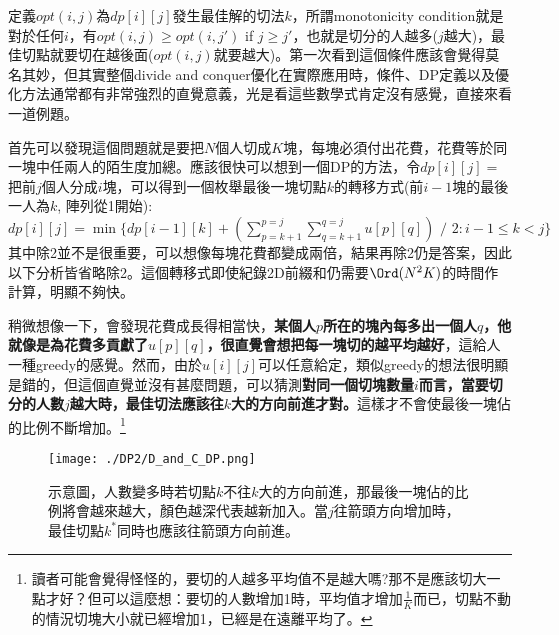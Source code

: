 定義$opt(i, j)$為$dp[i][j]$發生最佳解的切法$k$，所謂monotonicity condition就是對於任何$i$，有$opt(i, j) \geq opt(i, j')$ if $j \geq j'$，也就是切分的人越多($j$越大)，最佳切點就要切在越後面($opt(i, j)$就要越大)。第一次看到這個條件應該會覺得莫名其妙，但其實整個divide and conquer優化在實際應用時，條件、DP定義以及優化方法通常都有非常強烈的直覺意義，光是看這些數學式肯定沒有感覺，直接來看一道例題。


首先可以發現這個問題就是要把$N$個人切成$K$塊，每塊必須付出花費，花費等於同一塊中任兩人的陌生度加總。應該很快可以想到一個DP的方法，令$dp[i][j] = $把前$j$個人分成$i$塊，可以得到一個枚舉最後一塊切點$k$的轉移方式(前$i-1$塊的最後一人為$k$, 陣列從1開始): \\
\hspace*{1.5cm} $dp[i][j] = \min\{dp[i - 1][k] + (\sum_{p = k + 1}^{p = j} \sum_{q = k + 1}^{q = j} u[p][q])\mbox{ / }2 : i - 1 \leq k < j \}$ \\
其中除2並不是很重要，可以想像每塊花費都變成兩倍，結果再除2仍是答案，因此以下分析皆省略除2。這個轉移式即使紀錄2D前綴和仍需要$\Ord(N^2K)$的時間作計算，明顯不夠快。

稍微想像一下，會發現花費成長得相當快，\textbf{某個人$p$所在的塊內每多出一個人$q$，他就像是為花費多貢獻了$u[p][q]$，很直覺會想把每一塊切的越平均越好}，這給人一種greedy的感覺。然而，由於$u[i][j]$可以任意給定，類似greedy的想法很明顯是錯的，但這個直覺並沒有甚麼問題，可以猜測\textbf{對同一個切塊數量$i$而言，當要切分的人數$j$越大時，最佳切法應該往$k$大的方向前進才對。}這樣才不會使最後一塊佔的比例不斷增加。\footnote{讀者可能會覺得怪怪的，要切的人越多平均值不是越大嗎?那不是應該切大一點才好？但可以這麼想：要切的人數增加1時，平均值才增加$\frac{1}{K}$而已，切點不動的情況切塊大小就已經增加1，已經是在遠離平均了。}

\begin{figure}[h!]
	\begin{center}
		\centerline{\texttt{[image: ./DP2/D\_and\_C\_DP.png]}}
		\caption{示意圖，人數變多時若切點$k$不往$k$大的方向前進，那最後一塊佔的比例將會越來越大，顏色越深代表越新加入。當$j$往箭頭方向增加時，最佳切點$k^*$同時也應該往箭頭方向前進。}
	\end{center}
\end{figure}

